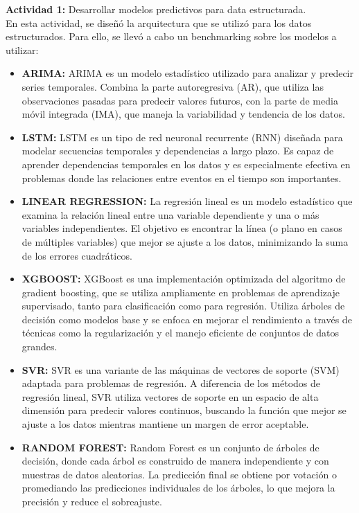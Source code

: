 		\textbf{Actividad 1: } Desarrollar modelos predictivos para data estructurada.\\
		En esta actividad, se diseñó la arquitectura que se utilizó para los datos estructurados. Para ello, se llevó a cabo un benchmarking sobre los modelos a utilizar:
		\begin{itemize}
			\item \textbf{ARIMA: } ARIMA es un modelo estadístico utilizado para analizar y predecir series temporales. Combina la parte autoregresiva (AR), que utiliza las observaciones pasadas para predecir valores futuros, con la parte de media móvil integrada (IMA), que maneja la variabilidad y tendencia de los datos.
			\item \textbf{LSTM: } LSTM es un tipo de red neuronal recurrente (RNN) diseñada para modelar secuencias temporales y dependencias a largo plazo. Es capaz de aprender dependencias temporales en los datos y es especialmente efectiva en problemas donde las relaciones entre eventos en el tiempo son importantes.
			\item \textbf{LINEAR REGRESSION: } La regresión lineal es un modelo estadístico que examina la relación lineal entre una variable dependiente y una o más variables independientes. El objetivo es encontrar la línea (o plano en casos de múltiples variables) que mejor se ajuste a los datos, minimizando la suma de los errores cuadráticos.
			\item \textbf{XGBOOST: } XGBoost es una implementación optimizada del algoritmo de gradient boosting, que se utiliza ampliamente en problemas de aprendizaje supervisado, tanto para clasificación como para regresión. Utiliza árboles de decisión como modelos base y se enfoca en mejorar el rendimiento a través de técnicas como la regularización y el manejo eficiente de conjuntos de datos grandes.
			\item \textbf{SVR: } SVR es una variante de las máquinas de vectores de soporte (SVM) adaptada para problemas de regresión. A diferencia de los métodos de regresión lineal, SVR utiliza vectores de soporte en un espacio de alta dimensión para predecir valores continuos, buscando la función que mejor se ajuste a los datos mientras mantiene un margen de error aceptable.
			\item \textbf{RANDOM FOREST: } Random Forest es un conjunto de árboles de decisión, donde cada árbol es construido de manera independiente y con muestras de datos aleatorias. La predicción final se obtiene por votación o promediando las predicciones individuales de los árboles, lo que mejora la precisión y reduce el sobreajuste.

\end{itemize}
